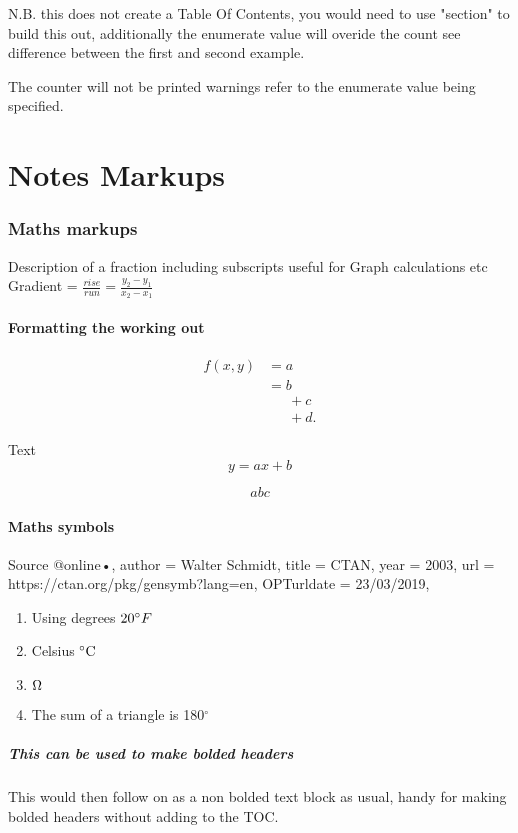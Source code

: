 \documentclass[fleqn]{report}
\begin{document}
N.B. this does not create a Table Of Contents, you would need to use "section" to build this out, additionally the enumerate value will overide the count see difference between the first and second example. \vspace{\baselineskip}

The counter will not be printed warnings refer to the enumerate value being specified.
\clearpage

\chapter{Notes Markups}

\subsection{Maths markups}
Description of a fraction including subscripts useful for Graph calculations etc
Gradient = {\Large $\frac{rise}{run} = \frac{y_2-y_1}{x_2-x_1}$}

\subsubsection{Formatting the working out}
\begin{equation}
\begin{split}
	f(x,y) & =a\\
       & = b \\[1ex]
       &\phantom{=}\, +c \\[2ex]
       &\phantom{=}\, +d.
\end{split}
\end{equation}

\noindent Text %
\begin{equation*} 
	y = ax + b
\end{equation*}

$$ abc $$

\subsubsection{Maths symbols}
Source @online{•,
author = {Wal­ter Sch­midt},
title = {CTAN},
year = {2003},
url = {https://ctan.org/pkg/gensymb?lang=en},
OPTurldate = {23/03/2019},
}


\begin{enumerate}
	\item Using degrees $20 \degree F$
	\item Celsius $ \celsius $
	\item $\ohm$
	\item The sum of a triangle is 180$^{\circ}$
\end{enumerate}

\paragraph{This can be used to make bolded headers} \mbox{} %

This would then follow on as a non bolded text block as usual, handy for making bolded headers without adding to the TOC.
\end{document}
